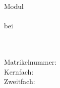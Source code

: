 
\fancyhead[C]{\textsc{\MakeLowercase{\kurztitel}}}

\ifx\event\undefined
\else
	\date[\mydate]{\today}
\fi

\expandafter\def\expandafter\quote\expandafter{\quote\onehalfspacing}

\doublespacing




\thispagestyle{empty}
\begin{titlepage}
\singlespacing

\quad \\[4cm]

\begin{center}
\begin{minipage}{0.8\linewidth}
\begin{center}
\textsc{\MakeLowercase{\autor}} \\[1cm]
{%
    \scshape\Large\onehalfspacing
    \titel \par}
\end{center}
\end{minipage}

\vskip 3.8cm
\emph{\art}
\end{center}

\vfill


\noindent\begin{minipage}{0.5\linewidth}
Modul \emph{\modul} \\
\veranstaltung \\
bei \dozentin \\
\institut \\
\universitaet
\end{minipage}
\begin{minipage}{0.5\linewidth}
\begin{flushright}
\email \\
Matrikelnummer: \matrikelnummer \\
Kernfach:  \\
Zweitfach: \zweitfach \\
\datum
\end{flushright}
\end{minipage}



\end{titlepage}


{\singlespacing \tableofcontents}
\pagebreak

\setcounter{page}{1}
